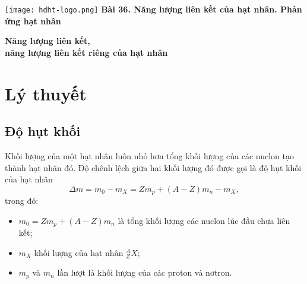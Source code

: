 \newcommand{\chapter}[2][]{
	\newcommand{\chapname}{#2}
	\begin{flushleft}
		\begin{minipage}[t]{\linewidth}
			\texttt{[image: hdht-logo.png]}
			\hspace{0pt}	
			\sffamily\bfseries\large Bài  36. Năng lượng liên kết của hạt nhân. Phản ứng hạt nhân
			\begin{flushleft}
				\huge\bfseries #1
			\end{flushleft}
		\end{minipage}
	\end{flushleft}
	\vspace{1cm}
	\normalfont\normalsize
}
\chapter[Năng lượng liên kết, \\năng lượng liên kết riêng của hạt nhân]{Năng lượng liên kết,\\ năng lượng liên kết riêng của hạt nhân}
\section{Lý thuyết}

\subsection{Độ hụt khối}
	Khối lượng của một hạt nhân luôn nhỏ hơn tổng khối lượng của các nuclon tạo thành hạt nhân đó. Độ chênh lệch giữa hai khối lượng đó được gọi là độ hụt khối của hạt nhân
	\begin{equation}
	\Delta m = m_0 - m_X = Z m_p+ (A-Z) m_n - m_X,
	\end{equation}
	trong đó:
	\begin{itemize}
		\item $m_0=Z m_p+ (A-Z) m_n$ là tổng khối lượng các nuclon lúc đầu chưa liên kết;
		\item $m_X$ khối lượng của hạt nhân $^A_Z X$;
		\item $m_p$ và $m_n$ lần lượt là khối lượng của các proton và nơtron.
	\end{itemize}
